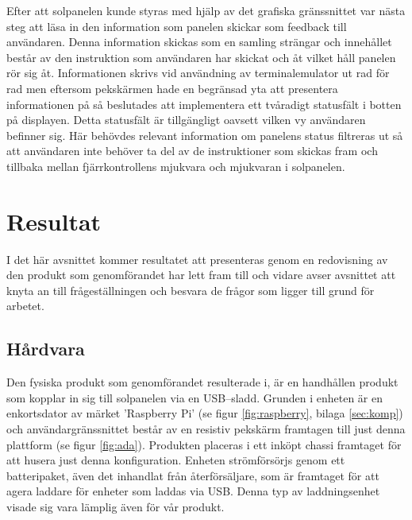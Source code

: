\documentclass{article}
\begin{document}
            \noindent Efter att solpanelen kunde styras med hjälp av det grafiska gränssnittet var nästa steg att läsa in den information som panelen skickar som feedback till användaren. Denna information skickas som  en samling strängar och innehållet består av den instruktion som användaren har skickat och åt vilket håll panelen rör sig åt. 
            Informationen skrivs vid användning av terminalemulator ut rad för rad men eftersom pekskärmen hade en begränsad yta att presentera informationen på så beslutades att implementera ett tvåradigt statusfält i botten på displayen. Detta statusfält är tillgängligt oavsett vilken vy användaren befinner sig.
            Här behövdes relevant information om panelens status filtreras ut så att användaren inte behöver ta del av de instruktioner som skickas fram och tillbaka mellan fjärrkontrollens mjukvara och mjukvaran i solpanelen. \\





    \newpage

    \section{Resultat} %
    \label{sec:resultat}
        I det här avsnittet kommer resultatet att presenteras genom en redovisning av den produkt som genomförandet har lett fram till och 
        vidare avser avsnittet att knyta an till frågeställningen och besvara de frågor som ligger till grund för arbetet. \\

        \subsection{Hårdvara} %
        \label{sub:h_rdvara}
        Den fysiska produkt som genomförandet resulterade i, är en handhållen produkt som kopplar in sig till sol\-panel\-en via en USB--sladd. Grunden i enheten är en enkorts\-dator av märket 'Raspberry Pi' (se figur \ref{fig:raspberry}, bilaga \ref{sec:komp}) och användargränssnittet består av en resistiv pekskärm framtagen till just denna plattform \cite{Ada} (se figur \ref{fig:ada}). Produkten placeras i ett inköpt chassi framtaget för att husera just denna konfiguration. Enheten strömförsörjs genom ett batteripaket, även det inhandlat från återförsäljare, som är framtaget för att agera laddare för enheter som laddas via USB. Denna typ av laddningsenhet visade sig vara lämplig även för vår produkt.
\end{document}
